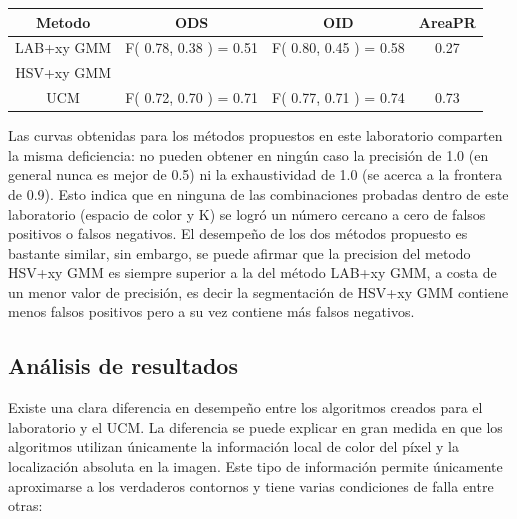 \documentclass[10pt,twocolumn,letterpaper]{article}
\begin{document}
\begin{table}[t]
\centering
\begin{tabular}{c | c | c | c }
Metodo & ODS & OID & AreaPR  \\
\hline	
LAB+xy GMM & F( 0.78, 0.38 ) = 0.51  & F( 0.80, 0.45 ) = 0.58 & 0.27 \\
HSV+xy GMM &  &  &  \\
UCM & F( 0.72, 0.70 ) = 0.71  & F( 0.77, 0.71 ) = 0.74 &  0.73\\
\end{tabular}
\label{table:thetable}
\end{table}


Las curvas obtenidas para los métodos propuestos en este laboratorio comparten la misma deficiencia:  no pueden obtener en ningún caso la precisión de 1.0 (en general nunca es mejor de 0.5) ni la exhaustividad de 1.0 (se acerca a la frontera de 0.9). Esto indica que en ninguna de las combinaciones probadas dentro de este laboratorio (espacio de color y K) se logró un número cercano a cero de falsos positivos o falsos negativos. El desempeño de los dos métodos propuesto es bastante similar, sin embargo, se puede afirmar que la precision del metodo HSV+xy GMM es siempre superior a la del método LAB+xy GMM, a costa de un menor valor de precisión, es decir la segmentación de HSV+xy GMM contiene menos falsos positivos pero a su vez contiene más falsos negativos.


\subsection{Análisis de resultados}

Existe una clara diferencia en desempeño entre los algoritmos creados para el laboratorio y el UCM. La diferencia se puede explicar en gran medida en que los algoritmos utilizan únicamente la información local de color del píxel y la localización absoluta en la imagen. Este tipo de información permite únicamente aproximarse a los verdaderos contornos y tiene varias condiciones de falla entre otras:
\end{document}
